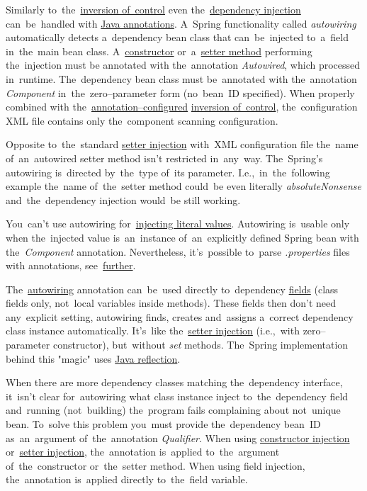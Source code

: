\label{autowiring}
Similarly to~the~\hyperref[inversionofcontrol]{inversion of~control} even the~\hyperref[dependencyinjection]{dependency injection} can~be~handled with \hyperref[javaannotation]{Java annotations}. A~Spring functionality called \textit{autowiring} automatically detects a~dependency bean class that can~be~injected to~a~field in~the~main bean class. A~\hyperref[constructorinjection]{constructor} or~a~\hyperref[setterinjection]{setter method} performing the~injection must be annotated with the~annotation \textit{Autowired}, which processed in~runtime. The~dependency bean class must be~annotated with the~annotation \textit{Component} in~the~zero--parameter form (no~bean~ID specified). When properly combined with the~\hyperref[iocannotations]{annotation--configured} \hyperref[inversionofcontrol]{inversion of~control}, the~configuration XML file contains only the~component scanning configuration.

\note Opposite to~the~standard \hyperref[setterinjection]{setter injection} with~XML configuration file the~name of~an~autowired setter method isn't restricted in~any~way. The~Spring's autowiring is~directed by~the~type of~its parameter. I.e.,~in~the~following example the~name of~the~setter method could~be even literally \textit{absoluteNonsense} and~the~dependency injection would~be still working.

\warning You~can't use autowiring for~\hyperref[injectingliteralvalues]{injecting literal values}. Autowiring is~usable only when the~injected value is~an~instance of~an~explicitly defined Spring bean with the~\textit{Component} annotation. Nevertheless, it's~possible to~parse \textit{.properties} files with annotations, see~\hyperref[readingpropertiesannotations]{further}.

\label{fieldinjection}
The~\hyperref[autowiring]{autowiring} annotation can~be~used directly to~dependency \hyperref[variablefieldproperty]{fields} (class fields only, not~local variables inside methods). These fields then don't need any~explicit setting, autowiring finds, creates and~assigns a~correct dependency class instance automatically. It's~like the~\hyperref[setterinjection]{setter injection} (i.e.,~with zero--parameter constructor), but~without \textit{set} methods. The~Spring implementation behind this "magic" uses \hyperref[reflection]{Java reflection}.

When there are more dependency classes matching the~dependency interface, it~isn't clear for~autowiring what class instance inject to~the~dependency field and~running (not~building) the~program fails complaining about not~unique bean. To~solve this problem you~must provide the~dependency bean~ID as~an~argument of~the~annotation \textit{Qualifier}. When using \hyperref[constructorinjectionautowire]{constructor injection} or~\hyperref[setterinjectionautowire]{setter injection}, the~annotation is~applied to~the~argument of~the~constructor or~the~setter method. When using field injection, the~annotation is~applied directly to~the~field variable.
\newpage


